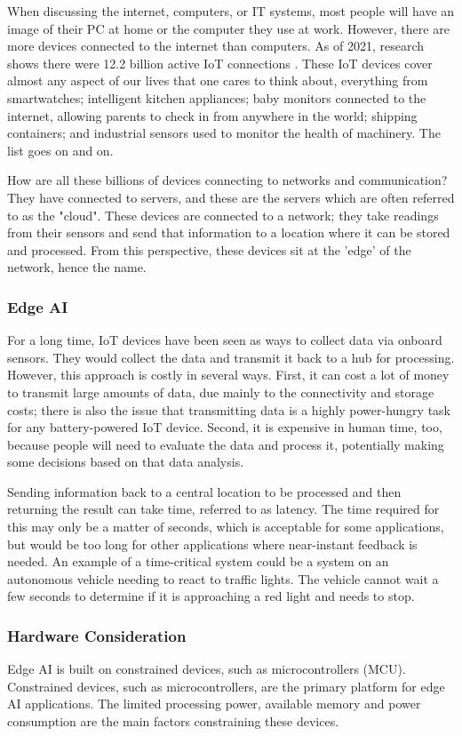 \documentclass[conference]{IEEEtran}
\begin{document}
When discussing the internet, computers, or IT systems, most people will have an image of their PC at home or the computer they use at work. However, there are more devices connected to the internet than computers. As of 2021, research shows there were 12.2 billion active IoT connections \cite{b3}. These IoT devices cover almost any aspect of our lives that one cares to think about, everything from smartwatches; intelligent kitchen appliances; baby monitors connected to the internet, allowing parents to check in from anywhere in the world; shipping containers; and industrial sensors used to monitor the health of machinery. The list goes on and on.

How are all these billions of devices connecting to networks and communication? They have connected to servers, and these are the servers which are often referred to as the "cloud".
These devices are connected to a network; they take readings from their sensors and send that information to a location where it can be stored and processed. From this perspective, these devices sit at the 'edge' of the network, hence the name.

\subsubsection{Edge AI}
For a long time, IoT devices have been seen as ways to collect data via onboard sensors. They would collect the data and transmit it back to a hub for processing. However, this approach is costly in several ways. First, it can cost a lot of money to transmit large amounts of data, due mainly to the connectivity and storage costs; there is also the issue that transmitting data is a highly power-hungry task for any battery-powered IoT device. Second, it is expensive in human time, too, because people will need to evaluate the data and process it, potentially making some decisions based on that data analysis.

Sending information back to a central location to be processed and then returning the result can take time, referred to as latency. The time required for this may only be a matter of seconds, which is acceptable for some applications, but would be too long for other applications where near-instant feedback is needed. An example of a time-critical system could be a system on an autonomous vehicle needing to react to traffic lights. The vehicle cannot wait a few seconds to determine if it is approaching a red light and needs to stop. 

\subsubsection{Hardware Consideration}
Edge AI is built on constrained devices, such as microcontrollers (MCU). Constrained devices, such as microcontrollers, are the primary platform for edge AI applications. The limited processing power, available memory and power consumption are the main factors constraining these devices. 
\end{document}
